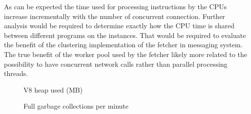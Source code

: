 \noindent
As can be expected the time used for processing instructions by the CPUs increase incrementally with the number of concurrent connection. Further analysis would be required to determine exactly how the CPU time is shared between different programs on the instances. That would be required to evaluate the benefit of the clustering implementation of the fetcher in messaging system. The true benefit of the worker pool used by the fetcher likely more related to the possibility to have concurrent network calls rather than parallel processing threads.
\\
\begin{figure}[h!]
	\centering
	 \hfill
	\caption{V8 heap used (MB)}
\end{figure}

\begin{figure}[h!]
	\centering
	 \hfill
	\caption{Full garbage collections per minute}
\end{figure}

